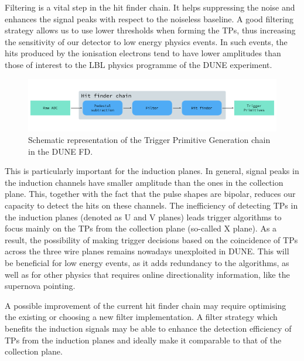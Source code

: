 Filtering is a vital step in the hit finder chain. It helps suppressing the noise and enhances the signal peaks with respect to the noiseless baseline. A good filtering strategy allows us to use lower thresholds when forming the TPs, thus increasing the sensitivity of our detector to low energy physics events. In such events, the hits produced by the ionisation electrons tend to have lower amplitudes than those of interest to the LBL physics programme of the DUNE experiment.

\begin{figure}[t]
	\centering
	\includegraphics[width=0.99\linewidth]{Images/Matched_Filter/trigger_primitive_chain.pdf}
	\caption{Schematic representation of the Trigger Primitive Generation chain in the DUNE FD.}
	\label{fig:tpg_chain}
\end{figure}

This is particularly important for the induction planes. In general, signal peaks in the induction channels have smaller amplitude than the ones in the collection plane. This, together with the fact that the pulse shapes are bipolar, reduces our capacity to detect the hits on these channels. The inefficiency of detecting TPs in the induction planes (denoted as U and V planes) leads trigger algorithms to focus mainly on the TPs from the collection plane (so-called X plane). As a result, the possibility of making trigger decisions based on the coincidence of TPs across the three wire planes remains nowadays unexploited in DUNE. This will be beneficial for low energy events, as it adds redundancy to the algorithms, as well as for other physics that requires online directionality information, like the supernova pointing.

A possible improvement of the current hit finder chain may require optimising the existing or choosing a new filter implementation. A filter strategy which benefits the induction signals may be able to enhance the detection efficiency of TPs from the induction planes and ideally make it comparable to that of the collection plane.  

